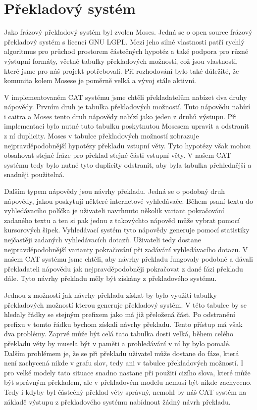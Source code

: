 \documentclass[12pt,a4paper]{report}
\begin{document}
\section{Překladový systém}

Jako frázový překladový systém byl zvolen Moses. Jedná se o open source frázový překladový systém s licencí GNU LGPL. Mezi jeho silné vlastnosti patří rychlý algoritmus pro průchod prostorem částečných hypotéz a také podpora pro různé výstupní formáty, včetně tabulky překladových možností, což jsou vlastnosti, které jsme pro náš projekt potřebovali. Při rozhodování bylo také důležité, že komunita kolem Mosese je poměrně velká a vývoj stále aktivní.

V implementovaném CAT systému jsme chtěli překladatelům nabízet dva druhy nápovědy. Prvním druh je tabulka překladových možností. Tuto nápovědu nabízí i caitra a Moses tento druh nápovědy nabízí jako jeden z druhů výstupu. Při implementaci bylo nutné tuto tabulku poskytnutou Mosesem upravit a odstranit z ní duplicity. Moses v tabulce překladových možností zobrazuje nejpravděpodobnější hypotézy překladu vstupní věty. Tyto hypotézy však mohou obsahovat stejné fráze pro překlad stejné části vstupní věty. V našem CAT systému tedy bylo nutné tyto duplicity odstranit, aby byla tabulka přehlednější a snadněji použitelná.

Dalším typem nápovědy jsou \clqq návrhy překladu\crqq . Jedná se o podobný druh nápovědy, jakou poskytují některé internetové vyhledávače. Během psaní textu do vyhledávacího políčka je uživateli navrhnuto několik variant pokračování zadaného textu a ten si pak jednu z takovýchto nápověd může vybrat pomocí kursorových šipek. Vyhledávací systém tyto nápovědy generuje pomocí statistiky nejčastěji zadaných vyhledávacích dotazů. Uživateli tedy dostane nejpravděpodobnější varianty pokračování při zadávání vyhledávacího dotazu. V našem CAT systému jsme chtěli, aby návrhy překladu fungovaly podobně a dávali překladateli nápovědu jak nejpravděpodobněji pokračovat z dané fázi překladu dále. Tyto návrhy překladu měly být získány z překladového systému.

Jednou z možností jak návrhy překladu získat by bylo využití tabulky překladových možností kterou generuje překladový systém. V této tabulce by se hledaly řádky se stejným prefixem jako má již přeložená část. Po odstranění prefixu v tomto řádku bychom získali návrhy překladu. Tento přístup má však dva problémy. Zaprvé může být celá tato tabulka dosti velká, během celého překladu věty by musela být v paměti a prohledávání v ní by bylo pomalé. Dalším problémem je, že se při překladu uživatel může dostane do fáze, která není zachycená nikde v grafu slov, tedy ani v tabulce překladových možností. I pro velké modely tato situace snadno nastane při použití cizího slova, které může být správným překladem, ale v překladovém modelu nemusí být nikde zachyceno. Tedy i kdyby byl částečný překlad věty správný, nemohl by náš CAT systém na základě výstupu z překladového systému nabídnout žádný návrh překladu.
\end{document}
